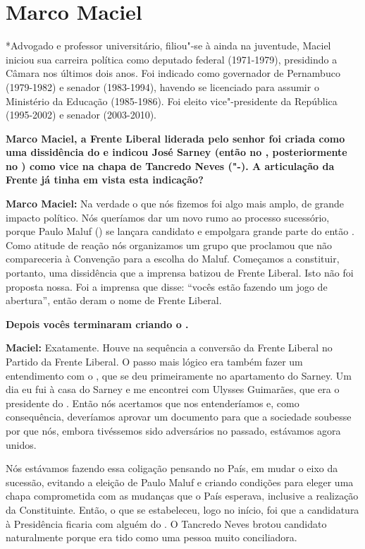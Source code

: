 \chapter{Marco Maciel}

*Advogado e professor universitário, filiou"-se à  ainda na
juventude, Maciel iniciou sua carreira política como deputado federal
(1971-1979), presidindo a Câmara nos últimos dois anos. Foi indicado
como governador de Pernambuco (1979-1982) e senador (1983-1994), havendo
se licenciado para assumir o Ministério da Educação (1985-1986). Foi
eleito vice"-presidente da República (1995-2002) e senador (2003-2010).

\textbf{Marco Maciel, a Frente Liberal liderada pelo senhor foi criada
como uma dissidência do  e indicou José Sarney (então no ,
posteriormente no ) como vice na chapa de Tancredo Neves ("-). A
articulação da Frente já tinha em vista esta indicação?}

\textbf{Marco Maciel:} Na verdade o que nós fizemos foi algo mais amplo,
de grande impacto político. Nós queríamos dar um novo rumo ao processo
sucessório, porque Paulo Maluf () se lançara candidato e empolgara
grande parte do então . Como atitude de reação nós organizamos um
grupo que proclamou que não compareceria à Convenção para a escolha do
Maluf. Começamos a constituir, portanto, uma dissidência que a imprensa
batizou de Frente Liberal. Isto não foi proposta nossa. Foi a imprensa
que disse: ``vocês estão fazendo um jogo de abertura'', então deram o
nome de Frente Liberal.

\textbf{Depois vocês terminaram criando o .}

\textbf{Maciel:} Exatamente. Houve na sequência a conversão da Frente
Liberal no Partido da Frente Liberal. O passo mais lógico era também
fazer um entendimento com o , que se deu primeiramente no
apartamento do Sarney. Um dia eu fui à casa do Sarney e me encontrei com
Ulysses Guimarães, que era o presidente do . Então nós acertamos que
nos entenderíamos e, como consequência, deveríamos aprovar um documento
para que a sociedade soubesse por que nós, embora tivéssemos sido
adversários no passado, estávamos agora unidos.

Nós estávamos fazendo essa coligação pensando no País, em mudar o eixo
da sucessão, evitando a eleição de Paulo Maluf e criando condições para
eleger uma chapa comprometida com as mudanças que o País esperava,
inclusive a realização da Constituinte. Então, o que se estabeleceu,
logo no início, foi que a candidatura à Presidência ficaria com alguém
do . O Tancredo Neves brotou candidato naturalmente porque era tido
como uma pessoa muito conciliadora.

